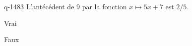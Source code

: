 \begin{truefalse}{q-1483}
L'antécédent de $9$ par la fonction $x\mapsto 5x+7$ est $2/5$.
\item* Vrai
\item Faux
\end{truefalse}

